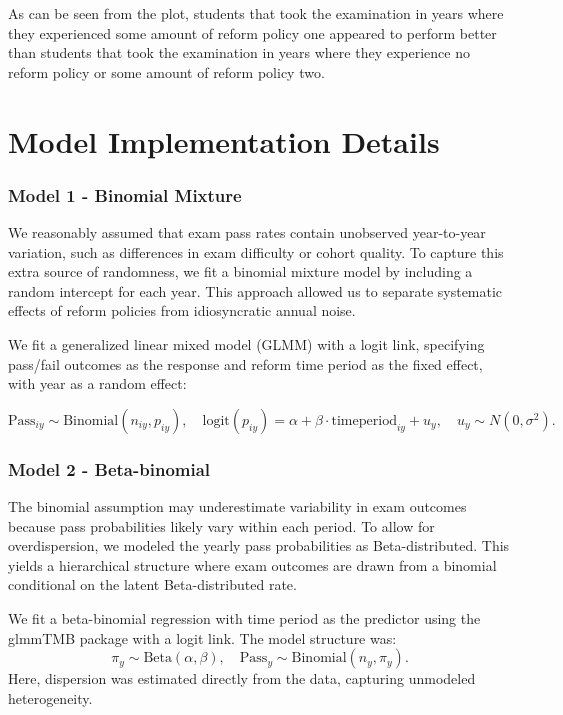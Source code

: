 \documentclass[
  letterpaper,
  DIV=11,
  numbers=noendperiod]{scrartcl}
\begin{document}
As can be seen from the plot, students that took the examination in
years where they experienced some amount of reform policy one appeared
to perform better than students that took the examination in years where
they experience no reform policy or some amount of reform policy two.

\section{Model Implementation
Details}\label{model-implementation-details}

\subsubsection{Model 1 - Binomial
Mixture}\label{model-1---binomial-mixture}

We reasonably assumed that exam pass rates contain unobserved
year-to-year variation, such as differences in exam difficulty or cohort
quality. To capture this extra source of randomness, we fit a binomial
mixture model by including a random intercept for each year. This
approach allowed us to separate systematic effects of reform policies
from idiosyncratic annual noise.

We fit a generalized linear mixed model (GLMM) with a logit link,
specifying pass/fail outcomes as the response and reform time period as
the fixed effect, with year as a random effect:

\[
\text{Pass}_{iy} \sim \text{Binomial}(n_{iy}, p_{iy}), \quad \text{logit}(p_{iy}) = \alpha + \beta \cdot \text{timeperiod}_{iy} + u_y, \quad u_y \sim N(0, \sigma^2).
\]

\subsubsection{Model 2 - Beta-binomial}\label{model-2---beta-binomial}

The binomial assumption may underestimate variability in exam outcomes
because pass probabilities likely vary within each period. To allow for
overdispersion, we modeled the yearly pass probabilities as
Beta-distributed. This yields a hierarchical structure where exam
outcomes are drawn from a binomial conditional on the latent
Beta-distributed rate.

We fit a beta-binomial regression with time period as the predictor
using the glmmTMB package with a logit link. The model structure was: \[
\pi_y \sim \text{Beta}(\alpha, \beta), \quad \text{Pass}_y \sim \text{Binomial}(n_y, \pi_y).
\] Here, dispersion was estimated directly from the data, capturing
unmodeled heterogeneity.
\end{document}
